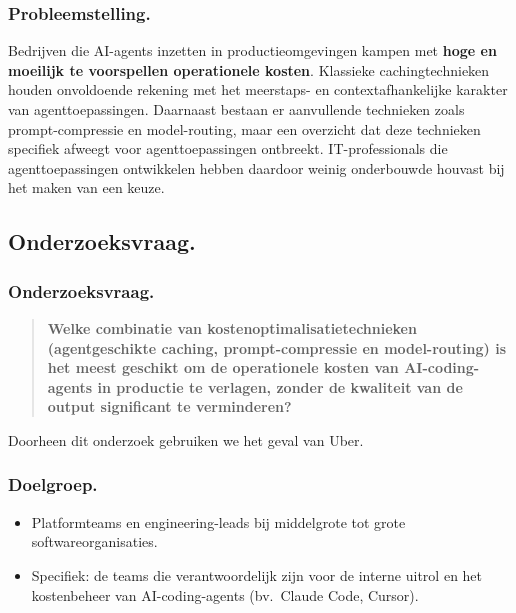 \documentclass[aspectratio=169]{beamer}
\begin{document}
\begin{frame}
    \frametitle{Probleemstelling.}

    Bedrijven die AI-agents inzetten in productieomgevingen kampen met
   \textbf{ hoge en moeilijk te voorspellen operationele kosten}. Klassieke
    cachingtechnieken houden onvoldoende rekening met het meerstaps- en
    contextafhankelijke karakter van agenttoepassingen. Daarnaast bestaan
    er aanvullende technieken zoals prompt-compressie en model-routing,
    maar een overzicht dat deze technieken specifiek afweegt voor
    agenttoepassingen ontbreekt. IT-professionals die agenttoepassingen
    ontwikkelen hebben daardoor weinig onderbouwde houvast bij het maken
    van een keuze.
\end{frame}

\subsection{Onderzoeksvraag.}

\begin{frame}
    \frametitle{Onderzoeksvraag.}

    \begin{quote}
        \textbf{Welke combinatie van kostenoptimalisatietechnieken
        (agentgeschikte caching, prompt-compressie en model-routing) is het meest geschikt om de operationele kosten van AI-coding-agents in productie te verlagen, zonder de kwaliteit van de output
        significant te verminderen?}
    \end{quote}
	\text Doorheen dit onderzoek gebruiken we het geval van Uber.
\end{frame}

\begin{frame}
    \frametitle{Doelgroep.}

    \begin{itemize}
        \item Platformteams en engineering-leads bij middelgrote tot
            grote softwareorganisaties.
        \item Specifiek: de teams die verantwoordelijk zijn voor de
            interne uitrol en het kostenbeheer van AI-coding-agents
            (bv.\ Claude Code, Cursor).
    \end{itemize}
\end{frame}
\end{document}

